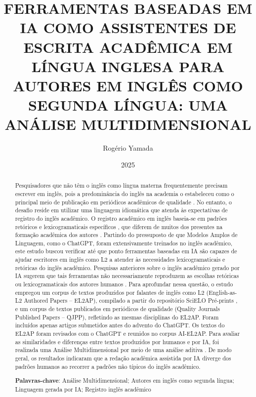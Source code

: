 \title{\Large \MakeUppercase{Ferramentas baseadas em IA como Assistentes de Escrita Acadêmica em Língua Inglesa para Autores em Inglês como Segunda Língua: Uma Análise Multidimensional}}
\author{Rogério Yamada} %
\date{2025}
\maketitle
\renewcommand{\abstractname}{Resumo}
\begin{abstract}
    Pesquisadores que não têm o inglês como língua materna frequentemente precisam escrever em inglês, pois a predominância do inglês na academia o estabeleceu como o principal meio de publicação em periódicos acadêmicos de qualidade \citep{belcherSeekingAcceptanceEnglishonly2007, baumvolScholarlyPublicationBrazilian2021, flowerdewEnglishResearchPublication2012, cargillIntroductionSpecialIssue2008}. No entanto, o desafio reside em utilizar uma linguagem idiomática que atenda às expectativas de registro do inglês acadêmico. O registro acadêmico em inglês baseia-se em padrões retóricos e lexicogramaticais específicos \citep{biberLexicalBundlesUniversity2007,adelRecurrentWordCombinations2012}, que diferem de muitos dos presentes na formação acadêmica dos autores \citep{adelRecurrentWordCombinations2012, pangLexicalBundlesConstruction2010, wrayConcludingQuestionWhy2019}. Partindo do pressuposto de que Modelos Amplos de Linguagem, como o ChatGPT, foram extensivamente treinados no inglês acadêmico, este estudo buscou verificar até que ponto ferramentas baseadas em IA são capazes de ajudar escritores em inglês como L2 a atender às necessidades lexicogramaticais e retóricas do inglês acadêmico. Pesquisas anteriores sobre o inglês acadêmico gerado por IA sugerem que tais ferramentas não necessariamente reproduzem as escolhas retóricas ou lexicogramaticais dos autores humanos \citep{berbersardinhaAIgeneratedHumanauthoredTexts2024}. Para aprofundar nessa questão, o estudo empregou um corpus de textos produzidos por falantes de inglês como L2 (English-as-L2 Authored Papers -- EL2AP), compilado a partir do repositório SciELO Pré-prints \citep{SciELOPreprints}, e um corpus de textos publicados em periódicos de qualidade (Quality Journals Published Papers -- QJPP), refletindo as mesmas disciplinas do EL2AP. Foram incluídos apenas artigos submetidos antes do advento do ChatGPT. Os textos do EL2AP foram revisados com o ChatGPT e reunidos no corpus AI-EL2AP. Para avaliar as similaridades e diferenças entre textos produzidos por humanos e por IA, foi realizada uma Análise Multidimensional \citep{biberVariationSpeechWriting1988, biberDimensionsRegisterVariation1995} por meio de uma análise aditiva \citep{berbersardinhaAddingRegistersPrevious2019}. De modo geral, os resultados indicaram que a redação acadêmica assistida por IA diverge dos padrões humanos ao recorrer a padrões não típicos do inglês acadêmico.

    \vspace{1em}
    \textbf{Palavras-chave}: Análise Multidimensional; Autores em inglês como segunda língua; Linguagem gerada por IA; Registro inglês acadêmico
\end{abstract}

